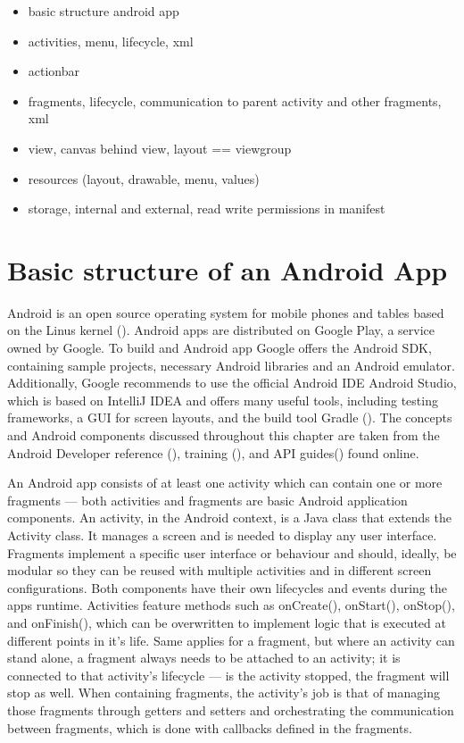 \begin{itemize}
\item basic structure android app
\item activities, menu, lifecycle, xml
\item actionbar
\item fragments, lifecycle, communication to parent activity and other fragments, xml
\item view, canvas behind view, layout == viewgroup
\item resources (layout, drawable, menu, values)
\item storage, internal and external, read write permissions in manifest
\end{itemize}

\section{Basic structure of an Android App}
Android is an open source operating system for mobile phones and tables based on the Linus kernel (\cite{androiddef}). Android apps are distributed on Google Play, a service owned by Google. To build and Android app Google offers the Android \gls{SDK}, containing sample projects, necessary Android libraries and an Android emulator. Additionally, Google recommends to use the official Android \gls{IDE} Android Studio, which is based on IntelliJ IDEA and offers many useful tools, including testing frameworks, a \gls{GUI} for screen layouts, and the build tool Gradle (\cite{androidstudio}). The concepts and Android components discussed throughout this chapter are taken from the Android Developer reference (\cite{androidreference}), training (\cite{androidtraining}), and \gls{API} guides(\cite{androidguides}) found online.

An Android app consists of  at least one activity which can contain one or more fragments --- both activities and fragments are basic Android application components. An activity, in the Android context, is a Java class that extends the Activity class. It manages a screen and is needed to display any user interface. Fragments implement a specific user interface or behaviour and should, ideally, be modular so they can be reused with multiple activities and in different screen configurations. Both components have their own lifecycles and events during the apps runtime. Activities feature methods such as onCreate(), onStart(), onStop(), and onFinish(), which can be overwritten to implement logic that is executed at different points in it’s life. Same applies for a fragment, but where an activity can stand alone, a fragment always needs to be attached to an activity; it is connected to that activity's lifecycle --- is the activity stopped, the fragment will stop as well.
When containing fragments, the activity’s job is that of managing those fragments through getters and setters and orchestrating the communication between fragments, which is done with callbacks defined in the fragments.

